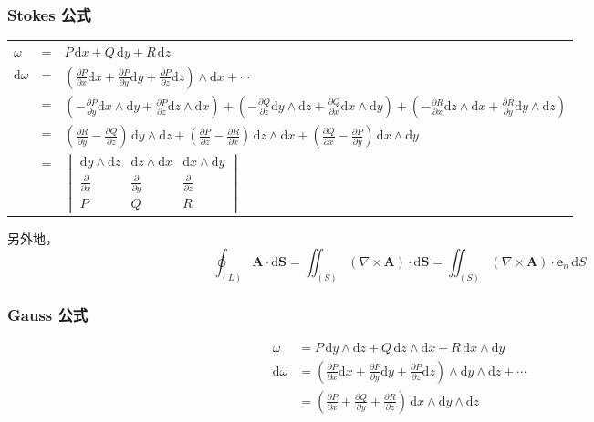 \documentclass[12pt, a4paper, UTF8, openany]{ctexbook}
\newcommand{\dif}{\mathrm{d}}
\newcommand{\sdif}{\,\dif}
\newcommand{\mat}[1]{\mathbf{#1}}
\begin{document}
        \subsubsection{Stokes 公式}
        {\begin{longtable}[h]{l l l}
            $\omega$ & = & $P\sdif x + Q\sdif y + R\sdif z$ \\
            \addlinespace
            $\dif \omega$ & = & $(\frac{\partial P}{\partial x}\dif x + \frac{\partial P}{\partial y}\dif y + \frac{\partial P}{\partial z}\dif z) \land \dif x + \cdots$ \\
            \addlinespace
            & = & $(-\frac{\partial P}{\partial y} \dif x \land \dif y + \frac{\partial P}{\partial z} \dif z \land \dif x) + 
            (-\frac{\partial Q}{\partial z} \dif y \land \dif z + \frac{\partial Q}{\partial x} \dif x \land \dif y) + 
            (-\frac{\partial R}{\partial x} \dif z \land \dif x + \frac{\partial R}{\partial y} \dif y \land \dif z)$ \\
            \addlinespace
            & = & $\boxed{(\frac{\partial R}{\partial y} - \frac{\partial Q}{\partial z}) \sdif y \land \dif z + 
            (\frac{\partial P}{\partial z} - \frac{\partial R}{\partial x}) \sdif z \land \dif x + 
            (\frac{\partial Q}{\partial x} - \frac{\partial P}{\partial y}) \sdif x \land \dif y}$ \\
            \addlinespace
            & = & $\begin{vmatrix}
                \dif y \land \dif z & \dif z \land \dif x & \dif x \land \dif y \\
                \frac{\partial}{\partial x} & \frac{\partial}{\partial y} & \frac{\partial}{\partial z} \\
                P & Q & R
            \end{vmatrix}$
        \end{longtable}}

        另外地，$$\oint_{(L)} \mat{A} \cdot \mat{\dif S} = \iint_{(S)} (\nabla \times \mat{A}) \cdot \mat{\dif S} = \iint_{(S)} (\nabla \times \mat{A}) \cdot \mat{e}_{n} \sdif S$$

        \subsubsection{Gauss 公式}
        $$\begin{aligned}
            \omega &= P \sdif y \land \dif z + Q \sdif z \land \dif x + R \sdif x \land \dif y \\
            \dif \omega &= (\frac{\partial P}{\partial x}\dif x + \frac{\partial P}{\partial y}\dif y + \frac{\partial P}{\partial z}\dif z) \land \dif y \land \dif z + \cdots \\
            &= \boxed{(\frac{\partial P}{\partial x} + \frac{\partial Q}{\partial y} + \frac{\partial R}{\partial z})\sdif x \land \dif y \land \dif z}
        \end{aligned}$$
\end{document}
